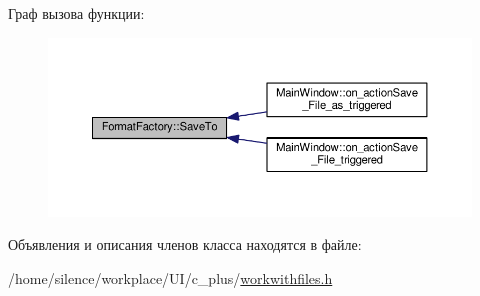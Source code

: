 Граф вызова функции\+:\nopagebreak
\begin{figure}[H]
\begin{center}
\leavevmode
\includegraphics[width=350pt]{class_format_factory_ac787363aa133a274ae674526dcc2b301_icgraph}
\end{center}
\end{figure}




Объявления и описания членов класса находятся в файле\+:\begin{DoxyCompactItemize}
\item 
/home/silence/workplace/\+U\+I/c\+\_\+plus/\hyperlink{workwithfiles_8h}{workwithfiles.\+h}\end{DoxyCompactItemize}
